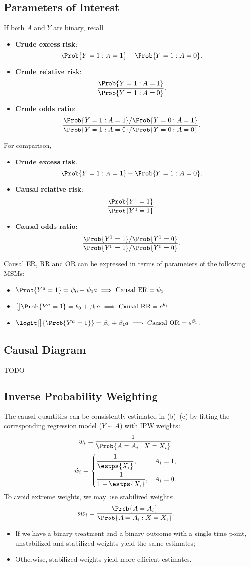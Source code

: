 \subsection*{Parameters of Interest}
If both $A$ and $Y$ are binary, recall
\begin{itemize}
      \item \textbf{Crude excess risk}:
            \[ \Prob{Y=1\given A=1}-\Prob{Y=1\given A=0}. \]
      \item \textbf{Crude relative risk}:
            \[ \frac{\Prob{Y=1\given A=1}}{\Prob{Y=1\given A=0}}. \]
      \item \textbf{Crude odds ratio}:
            \[ \frac{\Prob{Y=1\given A=1}/\Prob{Y=0\given A=1}}{\Prob{Y=1\given A=0}/\Prob{Y=0\given A=0}}. \]
\end{itemize}
For comparison,
\begin{itemize}
      \item \textbf{Crude excess risk}:
            \[ \Prob{Y=1\given A=1}-\Prob{Y=1\given A=0}. \]
      \item \textbf{Causal relative risk}:
            \[ \frac{\Prob{Y^1=1}}{\Prob{Y^0=1}}. \]
      \item \textbf{Causal odds ratio}:
            \[ \frac{\Prob{Y^1=1}/\Prob{Y^1=0}}{\Prob{Y^0=1}/\Prob{Y^0=0}}. \]
\end{itemize}
Causal ER, RR and OR can be expressed in terms of parameters of
the following MSMs:
\begin{itemize}
      \item $ \Prob{Y^a=1}=\psi_0+\psi_1 a\implies\text{Causal ER}=\psi_1 $.
      \item $ \log[\big]{\Prob{Y^a=1}}=\theta_0+\beta_1a\implies\text{Causal RR}=e^{\theta_1} $.
      \item $ \logit[\big]{\Prob{Y^a=1}}=\beta_0+\beta_1a\implies\text{Causal OR}=e^{\beta_1} $.
\end{itemize}
\subsection*{Causal Diagram}
TODO
\subsection*{Inverse Probability Weighting}
The causal quantities can be consistently estimated in (b)--(c) by
fitting the corresponding regression model ($Y \sim A$) with IPW
weights:
\[ w_i=\frac{1}{\Prob{A=A_i\given X=X_i}}. \]
\[ \hat{w}_i=\begin{dcases}
            \frac{1}{\estps{X_i}},   & A_i=1, \\
            \frac{1}{1-\estps{X_i}}, & A_i=0.
      \end{dcases} \]
To avoid extreme weights, we may use stabilized weights:
\[ sw_i=\frac{\Prob{A=A_i}}{\Prob{A=A_i\given X=X_i}}. \]
\begin{itemize}
      \item If we have a binary treatment and a binary outcome with a
            single time point, unstabilized and stabilized weights yield the
            same estimates;
      \item Otherwise, stabilized weights yield more efficient estimates.
\end{itemize}
